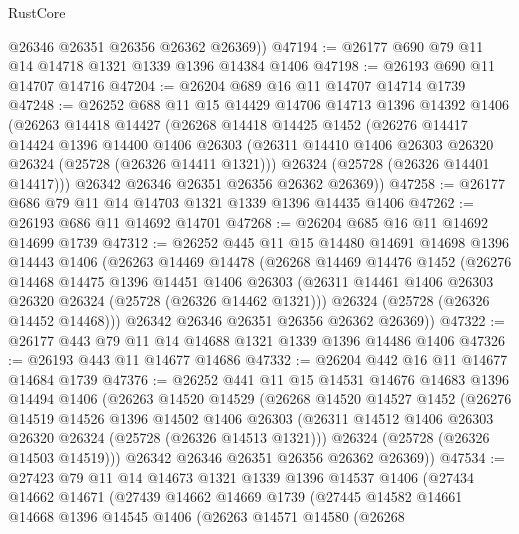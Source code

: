 \begin{lexlean}{RustCore}
\begin{coremodule}
        @26346
        @26351
        @26356
        @26362
        @26369))
@47194 := @26177 @690 @79 @11 @14 @14718 @1321 @1339 @1396 @14384 @1406
@47198 := @26193 @690 @11 @14707 @14716
@47204 := @26204 @689 @16 @11 @14707 @14714 @1739
@47248 := @26252
    @688
    @11
    @15
    @14429
    @14706
    @14713
    @1396
    @14392
    @1406
    (@26263
      @14418
      @14427
      (@26268
        @14418
        @14425
        @1452
        (@26276
          @14417
          @14424
          @1396
          @14400
          @1406
          @26303
          (@26311 @14410 @1406 @26303 @26320 @26324 (@25728 (@26326 @14411 @1321)))
          @26324
          (@25728 (@26326 @14401 @14417)))
        @26342
        @26346
        @26351
        @26356
        @26362
        @26369))
@47258 := @26177 @686 @79 @11 @14 @14703 @1321 @1339 @1396 @14435 @1406
@47262 := @26193 @686 @11 @14692 @14701
@47268 := @26204 @685 @16 @11 @14692 @14699 @1739
@47312 := @26252
    @445
    @11
    @15
    @14480
    @14691
    @14698
    @1396
    @14443
    @1406
    (@26263
      @14469
      @14478
      (@26268
        @14469
        @14476
        @1452
        (@26276
          @14468
          @14475
          @1396
          @14451
          @1406
          @26303
          (@26311 @14461 @1406 @26303 @26320 @26324 (@25728 (@26326 @14462 @1321)))
          @26324
          (@25728 (@26326 @14452 @14468)))
        @26342
        @26346
        @26351
        @26356
        @26362
        @26369))
@47322 := @26177 @443 @79 @11 @14 @14688 @1321 @1339 @1396 @14486 @1406
@47326 := @26193 @443 @11 @14677 @14686
@47332 := @26204 @442 @16 @11 @14677 @14684 @1739
@47376 := @26252
    @441
    @11
    @15
    @14531
    @14676
    @14683
    @1396
    @14494
    @1406
    (@26263
      @14520
      @14529
      (@26268
        @14520
        @14527
        @1452
        (@26276
          @14519
          @14526
          @1396
          @14502
          @1406
          @26303
          (@26311 @14512 @1406 @26303 @26320 @26324 (@25728 (@26326 @14513 @1321)))
          @26324
          (@25728 (@26326 @14503 @14519)))
        @26342
        @26346
        @26351
        @26356
        @26362
        @26369))
@47534 := @27423
    @79
    @11
    @14
    @14673
    @1321
    @1339
    @1396
    @14537
    @1406
    (@27434
      @14662
      @14671
      (@27439
        @14662
        @14669
        @1739
        (@27445
          @14582
          @14661
          @14668
          @1396
          @14545
          @1406
          (@26263
            @14571
            @14580
            (@26268

\end{coremodule}
\end{lexlean}
